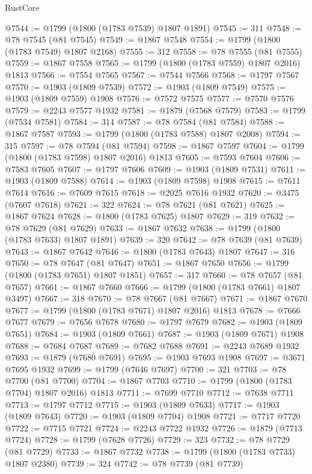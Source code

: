 \begin{lexlean}{RustCore}
\begin{coremodule}
@7544 := @1799 (@1800 (@1783 @7539) @1807 @1891)
@7545 := 311
@7548 := @78 @7545 (@81 @7545)
@7549 := @1867 @7548
@7554 := @1799 (@1800 (@1783 @7549) @1807 @2168)
@7555 := 312
@7558 := @78 @7555 (@81 @7555)
@7559 := @1867 @7558
@7565 := @1799 (@1800 (@1783 @7559) @1807 @2016) @1813
@7566 := @7554 @7565
@7567 := @7544 @7566
@7568 := @1797 @7567
@7570 := @1903 (@1809 @7539)
@7572 := @1903 (@1809 @7549)
@7575 := @1903 (@1809 @7559) @1908
@7576 := @7572 @7575
@7577 := @7570 @7576
@7579 := @2243 @7577 @1932
@7581 := @1879 (@7568 @7579)
@7583 := @1799 (@7534 @7581)
@7584 := 314
@7587 := @78 @7584 (@81 @7584)
@7588 := @1867 @7587
@7593 := @1799 (@1800 (@1783 @7588) @1807 @2008)
@7594 := 315
@7597 := @78 @7594 (@81 @7594)
@7598 := @1867 @7597
@7604 := @1799 (@1800 (@1783 @7598) @1807 @2016) @1813
@7605 := @7593 @7604
@7606 := @7583 @7605
@7607 := @1797 @7606
@7609 := @1903 (@1809 @7531)
@7611 := @1903 (@1809 @7588)
@7614 := @1903 (@1809 @7598) @1908
@7615 := @7611 @7614
@7616 := @7609 @7615
@7618 := @2025 @7616 @1932
@7620 := @3475 (@7607 @7618)
@7621 := 322
@7624 := @78 @7621 (@81 @7621)
@7625 := @1867 @7624
@7628 := @1800 (@1783 @7625) @1807
@7629 := 319
@7632 := @78 @7629 (@81 @7629)
@7633 := @1867 @7632
@7638 := @1799 (@1800 (@1783 @7633) @1807 @1891)
@7639 := 320
@7642 := @78 @7639 (@81 @7639)
@7643 := @1867 @7642
@7646 := @1800 (@1783 @7643) @1807
@7647 := 316
@7650 := @78 @7647 (@81 @7647)
@7651 := @1867 @7650
@7656 := @1799 (@1800 (@1783 @7651) @1807 @1851)
@7657 := 317
@7660 := @78 @7657 (@81 @7657)
@7661 := @1867 @7660
@7666 := @1799 (@1800 (@1783 @7661) @1807 @3497)
@7667 := 318
@7670 := @78 @7667 (@81 @7667)
@7671 := @1867 @7670
@7677 := @1799 (@1800 (@1783 @7671) @1807 @2016) @1813
@7678 := @7666 @7677
@7679 := @7656 @7678
@7680 := @1797 @7679
@7682 := @1903 (@1809 @7651)
@7684 := @1903 (@1809 @7661)
@7687 := @1903 (@1809 @7671) @1908
@7688 := @7684 @7687
@7689 := @7682 @7688
@7691 := @2243 @7689 @1932
@7693 := @1879 (@7680 @7691)
@7695 := @1903 @7693 @1908
@7697 := @3671 @7695 @1932
@7699 := @1799 (@7646 @7697)
@7700 := 321
@7703 := @78 @7700 (@81 @7700)
@7704 := @1867 @7703
@7710 := @1799 (@1800 (@1783 @7704) @1807 @2016) @1813
@7711 := @7699 @7710
@7712 := @7638 @7711
@7713 := @1797 @7712
@7715 := @1903 (@1809 @7633)
@7717 := @1903 (@1809 @7643)
@7720 := @1903 (@1809 @7704) @1908
@7721 := @7717 @7720
@7722 := @7715 @7721
@7724 := @2243 @7722 @1932
@7726 := @1879 (@7713 @7724)
@7728 := @1799 (@7628 @7726)
@7729 := 323
@7732 := @78 @7729 (@81 @7729)
@7733 := @1867 @7732
@7738 := @1799 (@1800 (@1783 @7733) @1807 @2380)
@7739 := 324
@7742 := @78 @7739 (@81 @7739)

\end{coremodule}
\end{lexlean}
